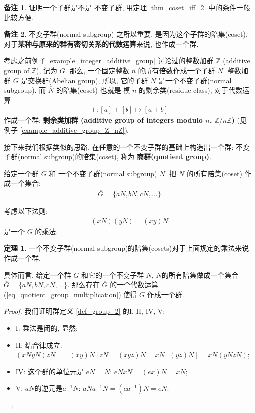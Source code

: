 \documentclass[utf8]{ctexbook}
\theoremstyle{definition}
\newtheorem{prototheorem}{定理}[section]
\newenvironment{theorem}
   {\colorlet{shadecolor}{pink!30}\begin{shaded}\begin{prototheorem}}
   {\end{prototheorem}\end{shaded}}
\newtheorem{memo}{备注}[section]
\begin{document}
\begin{memo}
证明一个子群是不是 不变子群, 用定理 \ref{thm_coset_iff_2} 中的条件一般比较方便.
\end{memo}

\begin{memo}
不变子群(normal subgroup) 之所以重要, 是因为这个子群的陪集(coset), 对于\textbf{某种与原来的群有密切关系的代数运算}来说, 也作成一个群.

考虑之前例子 \ref{example_integer_additive_group} 讨论过的整数加群 $ \mathbb{ Z} $ (additive group of $\mathbb{Z}$), 记为 $\overline{G}$. 那么, 一个固定整数 $n$ 的所有倍数作成一个子群 $\overline{N}$. 整数加群 $\overline{G}$ 是交换群(Abelian group), 所以, 它的子群 $\overline{N}$ 是一个不变子群(normal subgroup). 而 $\overline{N}$ 的陪集(coset) 也就是 模 $n$ 的剩余类(residue class), 对于代数运算
\begin{align*}
+ : [a] + [b] \mapsto [a+b]
\end{align*}
作成一个群: \textbf{剩余类加群 (additive group of integers modulo $n$, $\mathbb{Z}/n \mathbb{Z}$)} (见 例子 \ref{example_additive_group_Z_nZ}).

接下来我们根据类似的思路, 在任意的一个不变子群的基础上构造出一个群: 不变子群(normal subgroup)的陪集(coset), 称为 \textbf{商群(quotient group)}.
\end{memo}

给定一个群 $G$ 和 一个不变子群(normal subgroup) $N$. 把 $N$ 的所有陪集(coset) 作成一个集合:
\begin{align*}
\overline{G} = \{ aN, bN, cN, \ldots \}
\end{align*}

考虑以下法则:
\begin{align}
(xN) (yN) = (xy) N \label{eq_quotient_group_multiplication}
\end{align}
是一个 $\overline{G}$ 的乘法.

\begin{theorem}
一个不变子群(normal subgroup)的陪集(cosets)对于上面规定的乘法来说作成一个群.

具体而言, 给定一个群 $G$ 和它的一个不变子群 $N$, $N$的所有陪集做成一个集合 $\overline{G} = \{ aN, bN, cN, \ldots \}$. 那么存在 $\overline{G}$ 的一个代数运算 (\ref{eq_quotient_group_multiplication}) 使得 $\overline{G}$ 作成一个群.

\end{theorem}

\begin{proof}
我们证明群定义 \ref{def_group_2} 的I, II, IV, V:
\begin{itemize}
\item{I: 乘法是闭的, 显然;}
\item{II: 结合律成立: $ (x N y N) z N = [ (xy) N ] z N = (xyz) N  = x N [(yz) N] = x N ( y N z N)$;}
\item{IV: 这个群的单位元是 $eN =N$: $e N x N = (ex)N = x N$;}
\item{V: $aN$的逆元是$a^{-1}N$: $a N a^{-1} N = (a a^{-1}) N = e N$.}
\end{itemize}

\end{proof}
\end{document}
